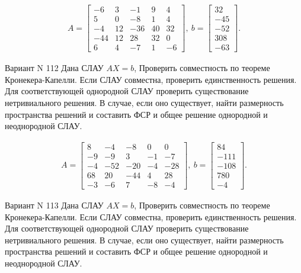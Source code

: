 \documentclass[11pt]{report}
\begin{document}
\begin{align*}
 A = \left[\begin{matrix}-6 & 3 & -1 & 9 & 4\\5 & 0 & -8 & 1 & 4\\-4 & 12 & -36 & 40 & 32\\-44 & 12 & 28 & 32 & 0\\6 & 4 & -7 & 1 & -6\end{matrix}\right],
\ b = \left[\begin{matrix}32\\-45\\-52\\308\\-63\end{matrix}\right]. 
 \end{align*}

Вариант N 112
Дана СЛАУ $AX = b$,
Проверить совместность по теореме Кронекера-Капелли. Если СЛАУ совместна, проверить единственность решения.
Для соответствующей однородной СЛАУ проверить существование нетривиального решения. В случае, если оно существует,
найти размерность пространства решений и составить ФСР и общее решение однородной  и неоднородной СЛАУ.


\begin{align*}
 A = \left[\begin{matrix}8 & -4 & -8 & 0 & 0\\-9 & -9 & 3 & -1 & -7\\-4 & -52 & -20 & -4 & -28\\68 & 20 & -44 & 4 & 28\\-3 & -6 & 7 & -8 & -4\end{matrix}\right],
\ b = \left[\begin{matrix}84\\-111\\-108\\780\\-4\end{matrix}\right]. 
 \end{align*}

Вариант N 113
Дана СЛАУ $AX = b$,
Проверить совместность по теореме Кронекера-Капелли. Если СЛАУ совместна, проверить единственность решения.
Для соответствующей однородной СЛАУ проверить существование нетривиального решения. В случае, если оно существует,
найти размерность пространства решений и составить ФСР и общее решение однородной  и неоднородной СЛАУ.
\end{document}
